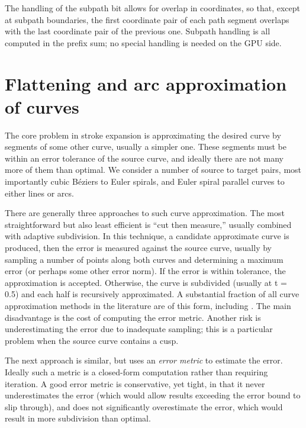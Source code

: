 \documentclass[format=acmsmall]{acmart}
\begin{document}
The handling of the subpath bit allows for overlap in coordinates, so that, except at subpath boundaries, the first coordinate pair of each path segment overlaps with the last coordinate pair of the previous one. Subpath handling is all computed in the prefix sum; no special handling is needed on the GPU side.

\section{Flattening and arc approximation of curves}


The core problem in stroke expansion is approximating the desired curve by segments of some other curve, usually a simpler one. These segments must be within an error tolerance of the source curve, and ideally there are not many more of them than optimal. We consider a number of source to target pairs, most importantly cubic Béziers to Euler spirals, and Euler spiral parallel curves to either lines or arcs.

There are generally three approaches to such curve approximation. The most straightforward but also least efficient is ``cut then measure,'' usually combined with adaptive subdivision. In this technique, a candidate approximate curve is produced, then the error is measured against the source curve, usually by sampling a number of points along both curves and determining a maximum error (or perhaps some other error norm). If the error is within tolerance, the approximation is accepted. Otherwise, the curve is subdivided (usually at t = 0.5) and each half is recursively approximated. A substantial fraction of all curve approximation methods in the literature are of this form, including \cite{Nehab2020}. The main disadvantage is the cost of computing the error metric. Another risk is underestimating the error due to inadequate sampling; this is a particular problem when the source curve contains a cusp.


The next approach is similar, but uses an \emph{error metric} to estimate the error. Ideally such a metric is a closed-form computation rather than requiring iteration. A good error metric is conservative, yet tight, in that it never underestimates the error (which would allow results exceeding the error bound to slip through), and does not significantly overestimate the error, which would result in more subdivision than optimal.
\end{document}
